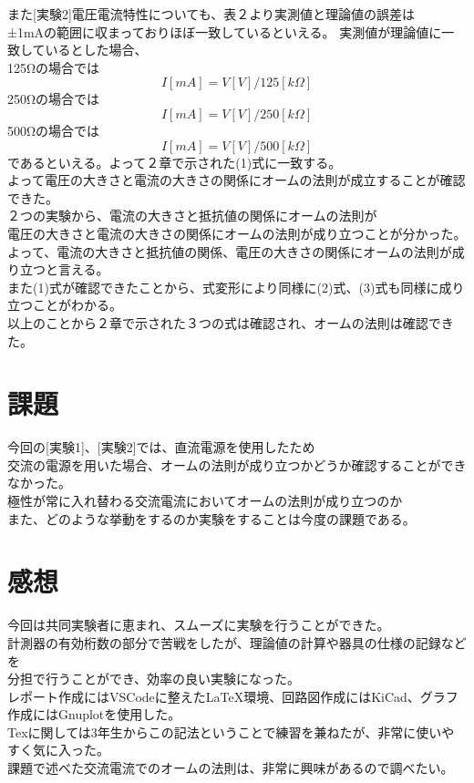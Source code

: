 \documentclass[titlepage]{jarticle}
\begin{document}
また[実験2]電圧電流特性についても、表２より実測値と理論値の誤差は\\
±1mAの範囲に収まっておりほぼ一致しているといえる。
実測値が理論値に一致しているとした場合、\\
125Ωの場合では
\begin{equation}
    I[mA]=V[V]/125[kΩ]
\end{equation}
250Ωの場合では
\begin{equation}
    I[mA]=V[V]/250[kΩ]
\end{equation}
500Ωの場合では
\begin{equation}
    I[mA]=V[V]/500[kΩ]
\end{equation}
であるといえる。よって２章で示された(1)式に一致する。\\
よって電圧の大きさと電流の大きさの関係にオームの法則が成立することが確認できた。\\

２つの実験から、電流の大きさと抵抗値の関係にオームの法則が\\
電圧の大きさと電流の大きさの関係にオームの法則が成り立つことが分かった。\\
よって、電流の大きさと抵抗値の関係、電圧の大きさの関係にオームの法則が成り立つと言える。\\
また(1)式が確認できたことから、式変形により同様に(2)式、(3)式も同様に成り立つことがわかる。\\
以上のことから２章で示された３つの式は確認され、オームの法則は確認できた。

\section{課題}
今回の[実験1]、[実験2]では、直流電源を使用したため\\
交流の電源を用いた場合、オームの法則が成り立つかどうか確認することができなかった。\\
極性が常に入れ替わる交流電流においてオームの法則が成り立つのか\\
また、どのような挙動をするのか実験をすることは今度の課題である。

\section{感想}
今回は共同実験者に恵まれ、スムーズに実験を行うことができた。\\
計測器の有効桁数の部分で苦戦をしたが、理論値の計算や器具の仕様の記録などを\\
分担で行うことができ、効率の良い実験になった。\\
レポート作成にはVSCodeに整えたLaTeX環境、回路図作成にはKiCad、グラフ作成にはGnuplotを使用した。\\
Texに関しては3年生からこの記法ということで練習を兼ねたが、非常に使いやすく気に入った。\\
課題で述べた交流電流でのオームの法則は、非常に興味があるので調べたい。\\
\end{document}
